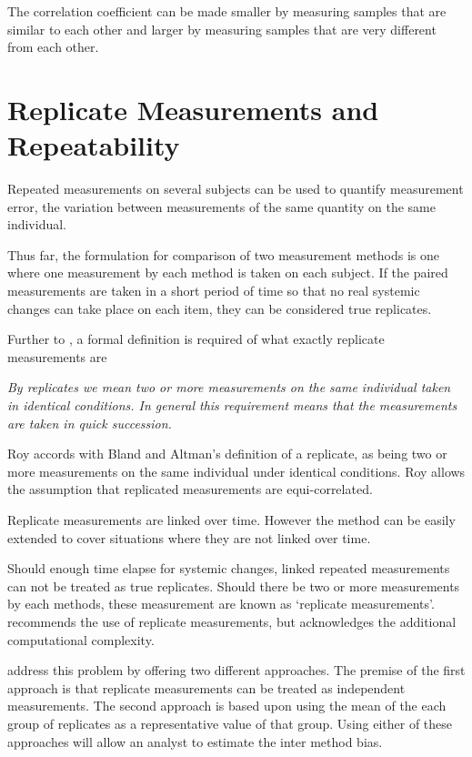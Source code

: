 \documentclass[12pt, a4paper]{report}
\theoremstyle{plain}
\theoremstyle{definition}
\theoremstyle{remark}
\begin{document}
	The correlation coefficient can be made smaller by measuring samples that are similar to each other and larger by measuring samples that are very different from each other. 
	
	
	\section{Replicate Measurements and Repeatability}
	
	
	
		
		Repeated measurements on several subjects can be used to quantify measurement error, the variation between measurements of the same 	quantity on the same individual.
		
	Thus far, the formulation for comparison of two measurement
	methods is one where one measurement by each method is taken on
	each subject. If the paired measurements are taken in a short period of time so that no real systemic changes can take place on each item, they can be considered true replicates.
	
	Further to \citet{BA99}, a formal definition is required of what exactly replicate measurements are
	
	\emph{By replicates we mean two or more measurements on the same
		individual taken in identical conditions. In general this requirement means that the
		measurements are taken in quick succession.}
	
	Roy accords with Bland and Altman's definition of a replicate, as being two or more measurements on the same individual under identical conditions. Roy allows the assumption that replicated measurements are equi-correlated. 
	
	Replicate measurements are linked over time. However the method can be easily extended to cover situations where they are not linked over time.
	
	 Should enough time elapse for systemic changes, linked repeated measurements can not be treated as true replicates. Should there be two or more measurements by each
	methods, these measurement are known as `replicate measurements'. \citet{BXC2008} recommends the use of replicate measurements, but acknowledges the additional computational complexity.
	
	\citet*{BA86} address this problem by offering two different approaches. The premise of the first approach is that replicate
	measurements can be treated as independent measurements. The second approach is based upon using the mean of the each group of
	replicates as a representative value of that group. Using either of these approaches will allow an analyst to estimate the inter
	method bias.
	
\end{document}
